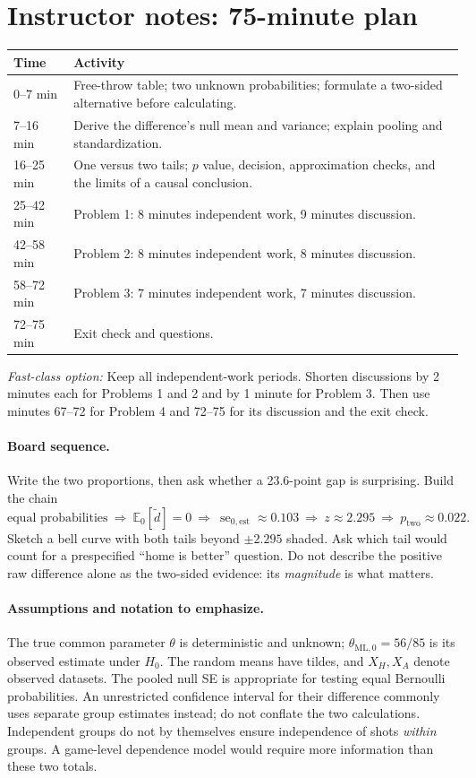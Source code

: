\documentclass[11pt]{article}
\newcommand{\rv}[1]{\widetilde{#1}}
\newcommand{\E}{\mathbb E}
\newcommand{\se}{\operatorname{se}}
\begin{document}
\section*{Instructor notes: 75-minute plan}
\begin{center}
\begin{tabular}{@{}p{}p{}@{}}
\toprule Time & Activity\\\midrule
0--7 min & Free-throw table; two unknown probabilities; formulate a
two-sided alternative before calculating.\\
7--16 min & Derive the difference's null mean and variance; explain
pooling and standardization.\\
16--25 min & One versus two tails; $p$ value, decision, approximation
checks, and the limits of a causal conclusion.\\
25--42 min & Problem 1: 8 minutes independent work, 9 minutes discussion.\\
42--58 min & Problem 2: 8 minutes independent work, 8 minutes discussion.\\
58--72 min & Problem 3: 7 minutes independent work, 7 minutes discussion.\\
72--75 min & Exit check and questions.\\\bottomrule
\end{tabular}
\end{center}
\noindent\textit{Fast-class option:} Keep all independent-work periods.
Shorten discussions by 2 minutes each for Problems 1 and 2 and by 1 minute
for Problem 3. Then use minutes 67--72 for Problem 4 and 72--75 for its
discussion and the exit check.

\paragraph{Board sequence.}
Write the two proportions, then ask whether a 23.6-point gap is surprising.
Build the chain
\[
 \text{equal probabilities}\ \Longrightarrow\ \E_0[\rv d]=0
 \ \Longrightarrow\ \se_{0,\mathrm{est}}\approx0.103
 \ \Longrightarrow\ z\approx2.295
 \ \Longrightarrow\ p_{\mathrm{two}}\approx0.022.
\]
Sketch a bell curve with both tails beyond $\pm2.295$ shaded. Ask which
tail would count for a prespecified ``home is better'' question. Do not
describe the positive raw difference alone as the two-sided evidence:
its \emph{magnitude} is what matters.

\paragraph{Assumptions and notation to emphasize.}
The true common parameter $\theta$ is deterministic and unknown;
$\theta_{\mathrm{ML},0}=56/85$ is its observed estimate under $H_0$.
The random means have tildes, and $X_H,X_A$ denote observed datasets.
The pooled null SE is appropriate for testing equal Bernoulli probabilities.
An unrestricted confidence interval for their difference commonly uses
separate group estimates instead; do not conflate the two calculations.
Independent groups do not by themselves ensure independence of shots
\emph{within} groups. A game-level dependence model would require more
information than these two totals.
\end{document}
